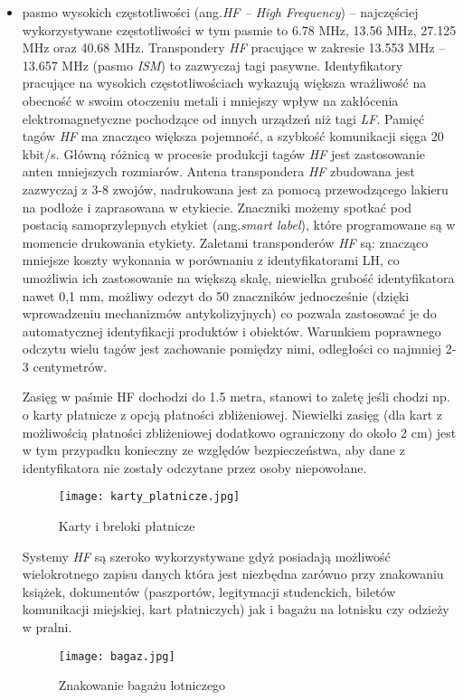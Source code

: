 \begin{itemize}
\begin{itemize}
\begin{itemize}
	\item pasmo wysokich częstotliwości (ang.\emph{HF – High Frequency}) – najczęściej wykorzystywane częstotliwości w tym pasmie to 6.78 MHz, 13.56 MHz, 27.125 MHz oraz 40.68 MHz. 
Transpondery \emph{HF} pracujące w zakresie 13.553 MHz – 13.657 MHz (pasmo \emph{ISM}) to zazwyczaj tagi pasywne. Identyfikatory pracujące na wysokich częstotliwościach wykazują większa wrażliwość na obecność w swoim otoczeniu metali i mniejszy wpływ na zakłócenia elektromagnetyczne pochodzące od  innych urządzeń niż tagi \emph{LF}. Pamięć tagów \emph{HF}  ma znacząco większa pojemność, a szybkość komunikacji sięga 20 kbit/s. Główną różnicą w procesie produkcji tagów \emph{HF} jest zastosowanie anten mniejszych rozmiarów. Antena transpondera \emph{HF} zbudowana jest zazwyczaj z 3-8 zwojów, nadrukowana jest za pomocą przewodzącego lakieru na podłoże i zaprasowana w etykiecie. Znaczniki możemy spotkać pod postacią samoprzylepnych etykiet (ang.\emph{smart label}), które programowane są w momencie drukowania etykiety. Zaletami transponderów \emph{HF} są: znacząco mniejsze koszty wykonania w porównaniu z identyfikatorami LH, co umożliwia ich zastosowanie na większą skalę, niewielka grubość identyfikatora nawet 0,1 mm, możliwy odczyt do 50 znaczników jednocześnie (dzięki wprowadzeniu mechanizmów antykolizyjnych) co pozwala zastosować je do automatycznej identyfikacji produktów i obiektów.  Warunkiem poprawnego odczytu wielu tagów jest zachowanie pomiędzy nimi, odległości co najmniej 2-3 centymetrów. 
	
	Zasięg w paśmie HF dochodzi do 1.5 metra, stanowi to zaletę jeśli chodzi np. o karty płatnicze z opcją płatności zbliżeniowej. Niewielki zasięg (dla kart z możliwością płatności zbliżeniowej dodatkowo ograniczony do około 2 cm) jest w tym przypadku konieczny ze względów bezpieczeństwa, aby dane z identyfikatora nie zostały odczytane przez osoby niepowołane. 

	\begin{figure}[h!]
	\centering
	    \texttt{[image: karty\_platnicze.jpg]}
	    \caption{Karty i breloki płatnicze}
	\end{figure}

	Systemy \emph{HF} są szeroko wykorzystywane gdyż posiadają możliwość wielokrotnego zapisu danych która jest niezbędna zarówno przy znakowaniu książek, dokumentów (paszportów, legitymacji studenckich, biletów komunikacji miejskiej, kart płatniczych) jak i bagażu na lotnisku czy odzieży w pralni.

	\begin{figure}[h!]
	\centering
	    \texttt{[image: bagaz.jpg]}
	    \caption{Znakowanie bagażu lotniczego}
	\end{figure}


\end{itemize}
\end{itemize}
\end{itemize}
